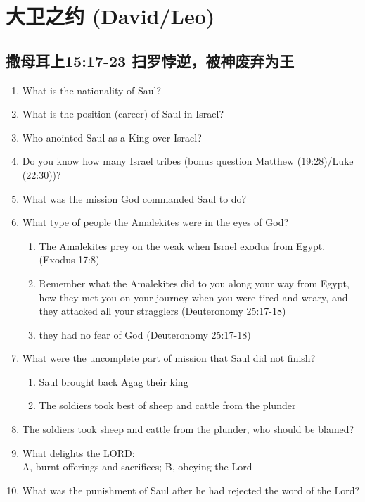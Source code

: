 \chapter{大卫之约 (David/Leo)}

\section{撒母耳上15:17-23 扫罗悖逆，被神废弃为王}
\begin{enumerate}[nosep]
\large
\item What is the nationality of Saul?
\item What is the position (career) of Saul in Israel? 
\item Who anointed Saul as a King over Israel?
\item Do you know how many Israel tribes (bonus question Matthew (19:28)/Luke (22:30))?
\item What was the mission God commanded Saul to do?
\item What type of people the Amalekites were in the eyes of God?
\begin{enumerate}[nosep]
\item The Amalekites prey on the weak when Israel exodus from Egypt.(Exodus 17:8)
\item Remember what the Amalekites did to you along your way from Egypt, how they met you on your journey when you were tired and weary, and they attacked all your stragglers (Deuteronomy 25:17-18)
\item  they had no fear of God (Deuteronomy 25:17-18)
\end{enumerate}
\item What were the uncomplete part of mission that Saul did not finish?
\begin{enumerate}[nosep]
\item Saul brought back Agag their king
\item The soldiers took best of sheep and cattle from the plunder
\end{enumerate}
\item The soldiers took sheep and cattle from the plunder, who should be blamed?
\item What delights the LORD:\\
 A, burnt offerings and sacrifices;\hspace{2cm} B, obeying the Lord
\item What was the punishment of Saul after he had rejected the word of the Lord?
\end{enumerate}

